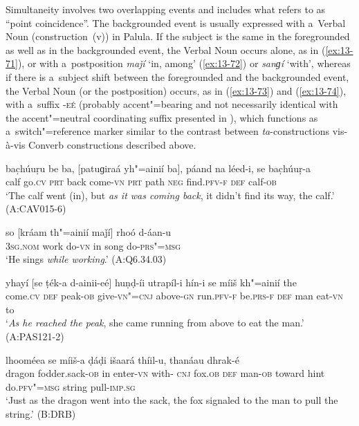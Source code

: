  Simultaneity involves two overlapping events and includes what
\citet[330]{givon2001b} refers to as ``point coincidence''. The backgrounded event
\citep[188--189]{thompsonlongacre1985} is usually expressed with a~Verbal Noun (construction~(v)) in
Palula. If the subject is the same in the foregrounded as well as in the backgrounded event, the
Verbal Noun occurs alone, as in (\ref{ex:13-71}), or with a~postposition \textit{maǰí} `in,
among' (\ref{ex:13-72}) or \textit{sanɡí} `with', whereas if there is a~subject shift between
the foregrounded and the backgrounded event, the Verbal Noun (or the postposition) occurs, as in
(\ref{ex:13-73}) and (\ref{ex:13-74}), with a~suffix \textsc{-eé} (probably
accent"=bearing and not necessarily identical with the accent"=neutral coordinating suffix presented
in ), which functions as a~switch"=reference marker similar to the contrast between
\textit{ta}-constructions vis-à-vis Converb constructions described above.

\begin{exe}
\ex
\label{ex:13-71}
\gll bac̣húuṛu be ba, [patuɡiraá yh"=ainií ba], páand na léed-i, se bac̣húuṛ-a \\
calf go.\textsc{cv} \textsc{prt } back come-\textsc{vn }  \textsc{prt} path \textsc{neg} find.\textsc{pfv-f} \textsc{def} calf-\textsc{ob}  \\
\glt `The calf went (in), but \textit{as it was coming back}, it didn't find its way, the calf.' (A:CAV015-6)

\ex
\label{ex:13-72}
\gll so [kráam th"=ainií maǰí] rhoó d-áan-u  \\
\textsc{3sg.nom} work do-\textsc{vn} in song do-\textsc{prs"=msg}  \\
\glt `He sings \textit{while working}.' (A:Q6.34.03)

\ex
\label{ex:13-73}
\gll yhayí [se ṭék-a d-ainii-eé] huṇḍ-íi utrapíl-i hín-i se míiš kh"=ainií the \\
come.\textsc{cv} \textsc{def} peak-\textsc{ob} give-\textsc{vn"=cnj} above-\textsc{gn} run.\textsc{pfv-f}  be.\textsc{prs-f } \textsc{def} man eat-\textsc{vn} to  \\
\glt `\textit{As he reached the peak}, she came running from above to eat the man.' (A:PAS121-2)

\ex
\label{ex:13-74}
 lhooméea se míiš-a ḍáḍi išaará thíil-u, thanáau dhrak-é \\
dragon fodder.sack-\textsc{ob} in enter-\textsc{vn} with-\textsc{ cnj}  fox.\textsc{ob} \textsc{def} man-\textsc{ob} toward hint do.\textsc{pfv"=msg} string pull-\textsc{imp.sg}  \\
\glt `Just as the dragon went into the sack, the fox signaled to the man to pull the string.' (B:DRB)
\end{exe}

